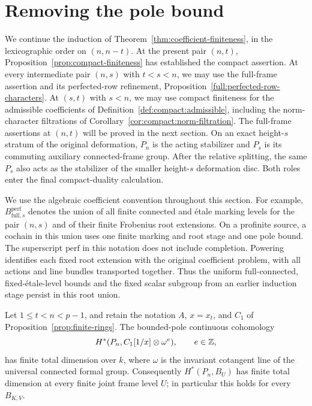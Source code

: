 \section{Removing the pole bound}
\label{sec:boundary}

We continue the induction of Theorem~\ref{thm:coefficient-finiteness},
in the lexicographic order on $(n,n-t)$.  At the present pair $(n,t)$,
Proposition~\ref{prop:compact-finiteness} has established the compact
assertion.  At every intermediate pair $(n,s)$ with $t<s<n$, we may use the
full-frame assertion and its perfected-row refinement,
Proposition~\ref{full:perfected-row-characters}.  At $(s,t)$ with
$s<n$, we may use compact finiteness for the admissible coefficients
of Definition~\ref{def:compact:admissible}, including the norm-character
filtrations of Corollary~\ref{cor:compact:norm-filtration}.
The full-frame assertions at $(n,t)$ will be proved in the next
section. On an exact height-$s$ stratum of the original deformation,
$P_n$ is the acting stabilizer and $P_s$ is its commuting auxiliary
connected-frame group. After the relative splitting, the same $P_s$
also acts as the stabilizer of the smaller height-$s$ deformation
disc. Both roles enter the final compact-duality calculation.

We use the algebraic coefficient convention throughout this section.
For example, $B_{\mathrm{full},s}^{\mathrm{perf}}$ denotes the union of
all finite connected and \mbox{\'etale} marking levels for the pair
$(n,s)$ and of their finite Frobenius root extensions.  On a profinite
source, a cochain in this union uses one finite marking and root stage
and one pole bound.  The superscript $\mathrm{perf}$ in this notation
does not include completion.  Powering identifies each fixed root
extension with the original coefficient problem, with all actions and
line bundles transported together.  Thus the uniform full-connected,
fixed-\'etale-level bounds and the fixed scalar subgroup from an earlier
induction stage persist in this root union.

\begin{proposition}
\label{prop:pole-removal}
Let $1\leq t<n<p-1$, and retain the notation $A$, $x=x_t$, and $C_1$
of Proposition~\ref{prop:finite-rings}.  The bounded-pole continuous
cohomology
\[
  H^*(P_n,C_1[1/x]\otimes\omega^e),\qquad e\in\mathbb Z,
\]
has finite total dimension over $k$, where $\omega$ is the invariant
cotangent line of the universal connected formal group.  Consequently
$H^*(P_n,B_U)$ has finite total dimension at every finite joint frame
level $U$; in particular this holds for every $B_{K,V}$.
\end{proposition}

